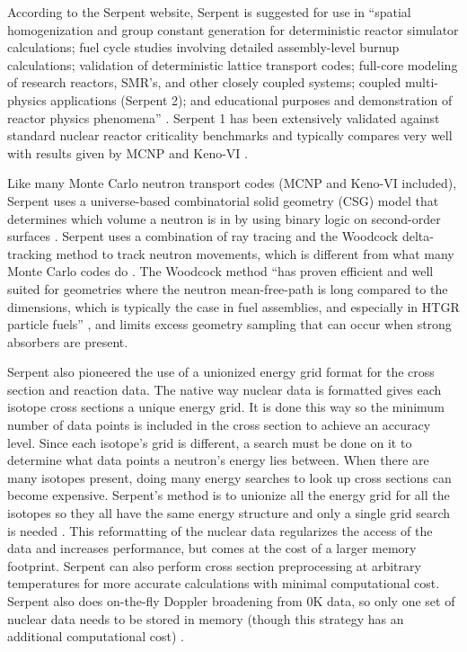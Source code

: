  According to the Serpent website, Serpent is suggested for use in ``spatial homogenization and group constant generation for deterministic reactor simulator calculations; fuel cycle studies involving detailed assembly-level burnup calculations; validation of deterministic lattice transport codes; full-core modeling of research reactors, SMR's, and other closely coupled systems; coupled multi-physics applications (Serpent 2);  and educational purposes and demonstration of reactor physics phenomena'' \cite{serpent}.  Serpent 1 has been extensively validated against standard nuclear reactor criticality benchmarks and typically compares very well with results given by MCNP and Keno-VI \cite{serpent}.

Like many Monte Carlo neutron transport codes (MCNP and Keno-VI included), Serpent uses a universe-based combinatorial solid geometry (CSG) model that determines which volume a neutron is in by using binary logic on second-order surfaces \cite{mcnp, serpent}.  Serpent uses a combination of ray tracing and the Woodcock delta-tracking method to track neutron movements, which is different from what many Monte Carlo codes do \cite{serpent}.  
The Woodcock method ``has proven efficient and well suited for geometries where the neutron mean-free-path is long compared to the dimensions, which is typically the case in fuel assemblies, and especially in HTGR particle fuels'' \cite{serpent}, and limits excess geometry sampling that can occur when strong absorbers are present.

Serpent also pioneered the use of a unionized energy grid format for the cross section and reaction data.  The native way nuclear data is formatted gives each isotope cross sections a unique energy grid.  It is done this way so the minimum number of data points is included in the cross section to achieve an accuracy level.  Since each isotope's grid is different, a search must be done on it to determine what data points a neutron's energy lies between.  When there are many isotopes present, doing many energy searches to look up cross sections can become expensive.  Serpent's method is to unionize all the energy grid for all the isotopes so they all have the same energy structure and only a single grid search is needed \cite{jaakko}.  
  This reformatting of the nuclear data regularizes the access of the data and increases performance, but comes at the cost of a larger memory footprint.  Serpent can also perform cross section preprocessing at arbitrary temperatures for more accurate calculations with minimal computational cost. Serpent also does on-the-fly Doppler broadening from 0K data, so only one set of nuclear data needs to be stored in memory (though this strategy has an additional computational cost) \cite{serpent}.

